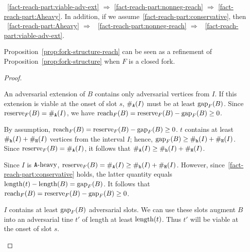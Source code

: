 \begin{proposition}\label{prop:fork-structure-reach}
    ~\ref{fact-reach-part:viable-adv-ext} $\Longrightarrow$
    \ref{fact-reach-part:nonneg-reach} $\Longrightarrow$
    \ref{fact-reach-part:Aheavy}.
    In addition, if we assume~\ref{fact-reach-part:conservative}, then 
    ~\ref{fact-reach-part:Aheavy} $\Longrightarrow$ 
    ~\ref{fact-reach-part:nonneg-reach} $\Longrightarrow$
    ~\ref{fact-reach-part:viable-adv-ext}.
\end{proposition}
Proposition~\ref{prop:fork-structure-reach} can be seen as 
a refinement of Proposition~\ref{prop:fork-structure} 
when $F$ is a closed fork. 
\begin{proof}~
  \begin{description}[font=\normalfont\itshape\space]
    \item[\ref{fact-reach-part:viable-adv-ext} implies~\ref{fact-reach-part:nonneg-reach}.]
      An adversarial extension of $B$ 
      contains only adversarial vertices from $I$. 
      If this extension is viable at the onset of slot $s$, 
      $\#_{\mathtt{A}}(I)$ must be at least $\operatorname{gap}_{F}(B)$.
      Since $\operatorname{reserve}_{F}(B) = \#_{\mathtt{A}}(I)$, we have 
      $\operatorname{reach}_{F}(B) = \operatorname{reserve}_{F}(B) - \operatorname{gap}_{F}(B) \geq 0$.  
      
    \item[\ref{fact-reach-part:nonneg-reach} implies~\ref{fact-reach-part:Aheavy}.]
      By assumption, $\operatorname{reach}_{F}(B)  = \operatorname{reserve}_{F}(B) - \operatorname{gap}_{F}(B) \geq 0$.               
      $t$ contains at least $\#_{\mathtt{h}}(I) + \#_{\mathtt{H}}(I)$ vertices from 
      the interval $I$; 
      hence, $\operatorname{gap}_{F}(B) \geq \#_{\mathtt{h}}(I) + \#_{\mathtt{H}}(I)$. 
      Since $\operatorname{reserve}_{F}(B) = \#_{\mathtt{A}}(I)$, 
      it follows that $\#_{\mathtt{A}}(I) \geq \#_{\mathtt{h}}(I) + \#_{\mathtt{H}}(I)$. 

    \item[\ref{fact-reach-part:conservative} and~\ref{fact-reach-part:Aheavy} implies~\ref{fact-reach-part:nonneg-reach}.]
      Since $I$ is $\mathtt{A}\text{-heavy}$, 
      $\operatorname{reserve}_F(B) = \#_{\mathtt{A}}(I) \geq \#_{\mathtt{h}}(I) + \#_{\mathtt{H}}(I)$. 
      However, since~\ref{fact-reach-part:conservative} holds, 
      the latter quantity equals $\operatorname{length}(t) - \operatorname{length}(B) = \operatorname{gap}_F(B)$. 
      It follows that $\operatorname{reach}_F(B) = \operatorname{reserve}_F(B) - \operatorname{gap}_F(B) \geq 0$. 

    \item[\ref{fact-reach-part:conservative} and~\ref{fact-reach-part:nonneg-reach} implies~\ref{fact-reach-part:viable-adv-ext}.]
      $I$ contains at least $\operatorname{gap}_F(B)$ adversarial slots. 
      We can use these slots augment $B$ 
      into an adversarial tine $t'$ 
      of length at least $\operatorname{length}(t)$. 
      Thus $t'$ will be viable at the onset of slot $s$.
  \end{description}  
\end{proof}


